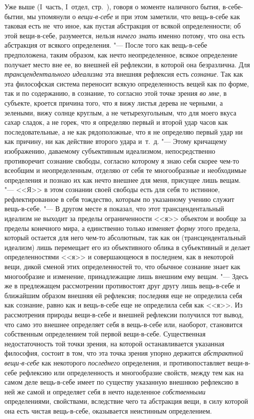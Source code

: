 Уже выше (I~часть, I~отдел, стр.~\pageref{bkm:bmThingInItself}), говоря о
моменте наличного бытия, в-себе-бытии, мы упомянули о
{\em вещи-в-себе} и при этом заметили, что вещь-в-себе
как таковая есть не~что иное, как пустая абстракция от всякой
определенности; об этой вещи-в-себе, разумеется, нельзя
{\em ничего знать} именно потому, что она есть
абстракция от всякого определения. "--- После того как вещь-в-себе
предположена, таким образом, как нечто неопределенное, всякое определение
получает место вне ее, во внешней ей рефлексии, в которой она безразлична.
Для {\em трансцендентального идеализма} эта внешняя
рефлексия есть {\em сознание}. Так как эта философская
система переносит всякую определенность вещей как по форме, так и по
содержанию, в сознание, то согласно этой точке зрения
{\em во мне}, в субъекте, кроется причина того, что я
вижу листья дерева не черными, а зелеными, вижу солнце круглым, а не
четырехугольным, что для моего вкуса сахар сладок, а не горек, что я
определяю первый и второй удар часов как последовательные, а не как
рядоположные, что я не определяю первый удар ни как причину, ни как
действие второго удара и~т.~д. "--- Этому кричащему изображению, даваемому
субъективным идеализмом, непосредственно противоречит сознание свободы,
согласно которому я знаю себя скорее чем-то всеобщим и неопределенным,
отделяю от себя те многообразные и необходимые определения и познаю их как
нечто внешнее для меня, присущее лишь вещам. "--- <<Я>> в этом сознании своей
свободы есть для себя то истинное, рефлектированное в себя тождество,
которым по указанному учению служит вещь-в-себе. "--- В другом месте я
показал, что этот трансцендентальный идеализм не выходит за пределы
ограниченности <<я>> объектом и вообще за пределы конечного мира, а
единственно только изменяет {\em форму} этого предела,
который остается для него чем-то абсолютным, так как он (трансцендентальный
идеализм) лишь перемещает его из объективного облика в субъективный и
делает определенностями <<я>> и совершающеюся в последнем, как в некоторой
вещи, дикой сменой этих определенностей то, что обычное сознание знает как
многообразие и изменение, принадлежащие лишь внешним ему вещам. "--- Здесь же
в предлежащем рассмотрении противостоят друг другу лишь вещь-в-себе и
ближайшим образом внешняя ей рефлексия; последняя еще не определила себя
как сознание, равно как и вещь-в-себе еще не определила себя как <<я>>. Из
рассмотрения природы вещи-в-себе и внешней рефлексии получился тот вывод,
что само это внешнее определяет себя в вещь-в-себе или, наоборот,
становится собственным определением той первой вещи-в-себе. Существенная
недостаточность той точки зрения, на которой останавливается указанная
философия, состоит в том, что эта точка зрения упорно держится
{\em абстрактной вещи-в-себе} как некоторого
{\em последнего} определения, и противопоставляет
вещи-в-себе рефлексию или определенность и многообразие свойств, между тем
как на самом деле вещь-в-себе имеет по существу указанную внешнюю рефлексию
в ней же самой и определяет себя в нечто наделенное
{\em собственными} определениями, свойствами,
вследствие чего та абстракция вещи, в силу которой она есть чистая
вещь-в-себе, оказывается неистинным определением.

